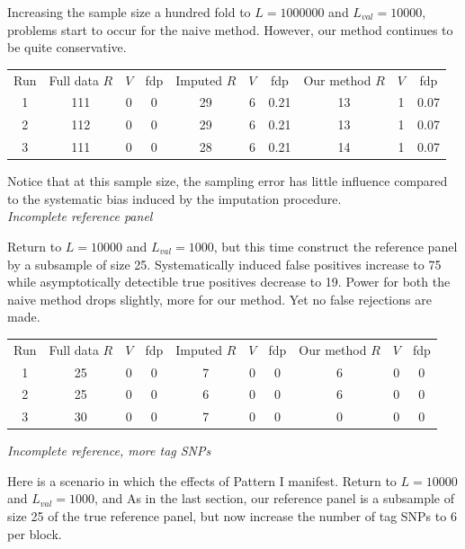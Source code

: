 \documentclass[12pt]{article}
\begin{document}
Increasing the sample size a hundred fold to $L=1000000$ and $L_{val}=10000$,
problems start to occur for the naive method.
However, our method continues to be quite
conservative.

\noindent
\begin{tabular}{|c|ccc|ccc|ccc|}
\hline
Run & Full data $R$ & $V$ & fdp & Imputed $R$ & $V$ & fdp & Our method
$R$ & $V$ & fdp\\
1 & 111 & 0 & 0 & 29 & 6 & 0.21 & 13 & 1 & 0.07\\
2 & 112 & 0 & 0 & 29 & 6 & 0.21 & 13 & 1 & 0.07\\
3 & 111 & 0 & 0 & 28 & 6 & 0.21 & 14 & 1 & 0.07\\
\hline
\end{tabular}
Notice that at this sample size, the sampling error has
little influence compared to the systematic bias
induced by the imputation procedure.
\[\]
\noindent\emph{Incomplete reference panel}

Return to $L=10000$ and $L_{val}=1000$, but this time construct
the reference panel by a subsample of size 25.
Systematically induced false positives increase to 75
while asymptotically detectible true positives decrease to 19.
Power for both the naive method drops slightly,
more for our method.
Yet no false rejections are made.

\noindent
\begin{tabular}{|c|ccc|ccc|ccc|}
\hline
Run & Full data $R$ & $V$ & fdp & Imputed $R$ & $V$ & fdp & Our method
$R$ & $V$ & fdp\\
1 & 25 & 0 & 0 & 7 & 0 & 0 & 6 & 0 & 0\\
2 & 25 & 0 & 0 & 6 & 0 & 0 &6 & 0 & 0\\
3 & 30 & 0 & 0 & 7 & 0 & 0 &0 & 0 & 0\\
\hline
\end{tabular}
\[\]
\noindent\emph{Incomplete reference, more tag SNPs}

Here is a scenario in which the effects of Pattern I manifest.
Return to $L=10000$ and $L_{val}=1000$, and 
As in the last section, our reference panel is a subsample of size 25 of the true
reference panel, but now increase the number of
tag SNPs to 6 per block.
\end{document}
